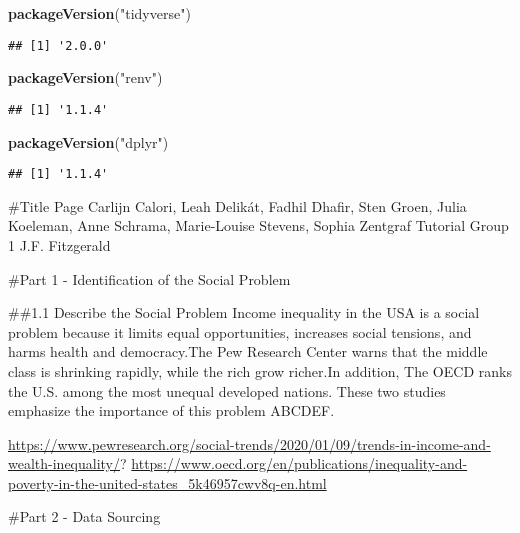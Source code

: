 \documentclass[
]{article}
\newenvironment{Shaded}{\begin{snugshade}}{\end{snugshade}}
\newcommand{\FunctionTok}[1]{\textcolor[rgb]{0.13,0.29,0.53}{\textbf{#1}}}
\newcommand{\NormalTok}[1]{#1}
\newcommand{\StringTok}[1]{\textcolor[rgb]{0.31,0.60,0.02}{#1}}
\begin{document}
\begin{Shaded}
\begin{Highlighting}[]
\FunctionTok{packageVersion}\NormalTok{(}\StringTok{"tidyverse"}\NormalTok{)}
\end{Highlighting}
\end{Shaded}

\begin{verbatim}
## [1] '2.0.0'
\end{verbatim}

\begin{Shaded}
\begin{Highlighting}[]
\FunctionTok{packageVersion}\NormalTok{(}\StringTok{"renv"}\NormalTok{)}
\end{Highlighting}
\end{Shaded}

\begin{verbatim}
## [1] '1.1.4'
\end{verbatim}

\begin{Shaded}
\begin{Highlighting}[]
\FunctionTok{packageVersion}\NormalTok{(}\StringTok{"dplyr"}\NormalTok{)}
\end{Highlighting}
\end{Shaded}

\begin{verbatim}
## [1] '1.1.4'
\end{verbatim}

\#Title Page Carlijn Calori, Leah Delikát, Fadhil Dhafir, Sten Groen,
Julia Koeleman, Anne Schrama, Marie-Louise Stevens, Sophia Zentgraf
Tutorial Group 1 J.F. Fitzgerald

\#Part 1 - Identification of the Social Problem

\#\#1.1 Describe the Social Problem Income inequality in the USA is a
social problem because it limits equal opportunities, increases social
tensions, and harms health and democracy.The Pew Research Center warns
that the middle class is shrinking rapidly, while the rich grow
richer.In addition, The OECD ranks the U.S. among the most unequal
developed nations. These two studies emphasize the importance of this
problem ABCDEF.

\url{https://www.pewresearch.org/social-trends/2020/01/09/trends-in-income-and-wealth-inequality/}?
\url{https://www.oecd.org/en/publications/inequality-and-poverty-in-the-united-states_5k46957cwv8q-en.html}

\#Part 2 - Data Sourcing
\end{document}
